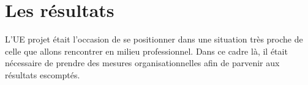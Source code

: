 \chapter{Les résultats}
L'UE projet était l'occasion de se positionner dans une situation très proche de celle que allons rencontrer en milieu professionnel. Dans ce cadre là, il était nécessaire de prendre des mesures organisationnelles afin de parvenir aux résultats escomptés. 


